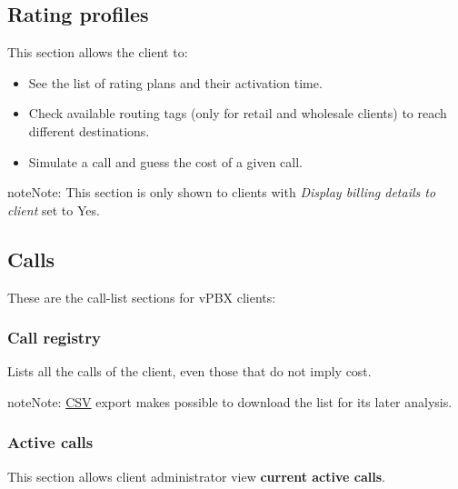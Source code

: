 \documentclass[letterpaper,10pt,english]{sphinxmanual}
\begin{document}
\subsection{Rating profiles}
\label{administration_portal/client/vpbx/rating_profiles:rating-profiles}\label{administration_portal/client/vpbx/rating_profiles::doc}
This section allows the client to:
\begin{itemize}
\item {} 
See the list of rating plans and their activation time.

\item {} 
Check available routing tags (only for retail and wholesale clients) to reach different destinations.

\item {} 
Simulate a call and guess the cost of a given call.

\end{itemize}

\begin{notice}{note}{Note:}
This section is only shown to clients with \emph{Display billing details to client} set to Yes.
\end{notice}


\subsection{Calls}
\label{administration_portal/client/vpbx/calls/index::doc}\label{administration_portal/client/vpbx/calls/index:calls}
These are the call-list sections for vPBX clients:


\subsubsection{Call registry}
\label{administration_portal/client/vpbx/calls/call_registry::doc}\label{administration_portal/client/vpbx/calls/call_registry:call-registry}\label{administration_portal/client/vpbx/calls/call_registry:id1}
Lists all the calls of the client, even those that do not imply cost.

\begin{notice}{note}{Note:}
\href{https://es.wikipedia.org/wiki/CSV}{CSV} export makes possible to
download the list for its later analysis.
\end{notice}


\subsubsection{Active calls}
\label{administration_portal/client/vpbx/calls/active_calls::doc}\label{administration_portal/client/vpbx/calls/active_calls:active-calls}
This section allows client administrator view \textbf{current active calls}.
\end{document}
